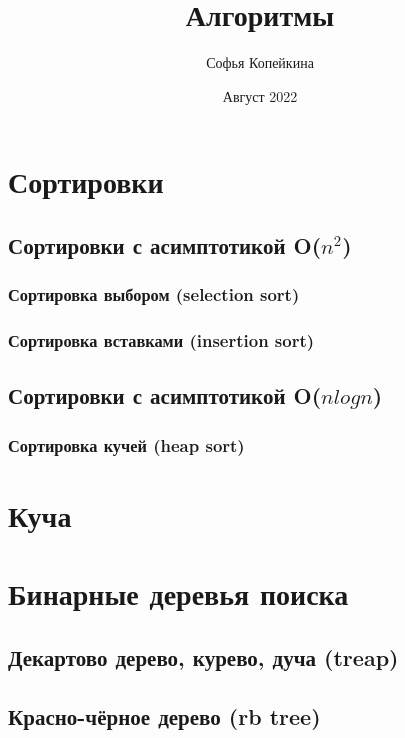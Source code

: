 \documentclass[b5paper]{article}
\title{Алгоритмы}
\author{Софья Копейкина}
\date{Август 2022}
\begin{document}
\setlength{\parindent}{0pt}
\pagestyle{fancy}
\maketitle
\newpage
\tableofcontents
\newpage

\section{Сортировки}
\subsection{Сортировки с асимптотикой O($n^2$)}
\subsubsection{Сортировка выбором (selection sort)}
\subsubsection{Сортировка вставками (insertion sort)}
\subsection{Сортировки с асимптотикой O($nlog n$)}
\subsubsection{Сортировка кучей (heap sort)}

\section{Куча}
\section{Бинарные деревья поиска}
\subsection{Декартово дерево, курево, дуча (treap)}
\subsection{Красно-чёрное дерево (rb tree)}
\end{document}

